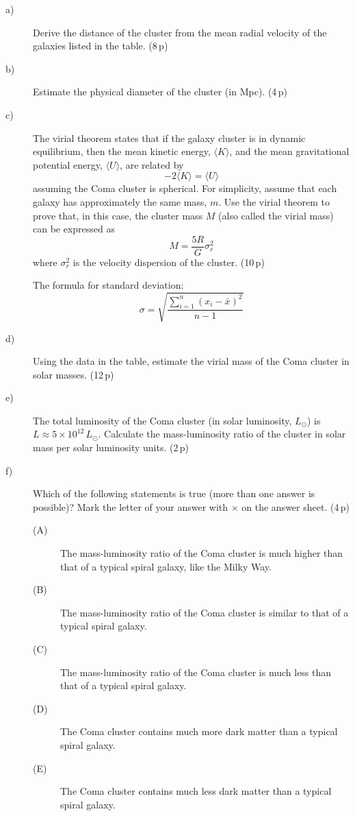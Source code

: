 \begin{description}
\item[a)] Derive the distance of the cluster from the mean radial velocity of
  the galaxies listed in the table. \hfill(8\,p)
\item[b)] Estimate the physical diameter of the cluster (in Mpc).
  \hfill(4\,p)
\item[c)] The virial theorem states that if the galaxy cluster is in dynamic
  equilibrium, then the mean kinetic energy, $\langle K\rangle$, and the mean
  gravitational potential energy, $\langle U\rangle$, are related by
  \[ -2\langle K\rangle = \langle U\rangle \]
  assuming the Coma cluster is spherical. For simplicity, assume that each
  galaxy has approximately the same mass, $m$. Use the virial theorem to prove
  that, in this case, the cluster mass $M$ (also called the virial mass) can
  be expressed as
  \[ M = \frac{5R}{G}\sigma_r^2 \]
  where $\sigma_r^2$ is the velocity dispersion of the cluster. \hfill(10\,p)

  The formula for standard deviation:
  \[ \sigma = \sqrt{\frac{\sum_{i=1}^{n}(x_i - \bar{x})^2}{n-1}} \]
\item[d)] Using the data in the table, estimate the virial mass of the Coma
  cluster in solar masses. \hfill(12\,p)
\item[e)] The total luminosity of the Coma cluster (in solar luminosity,
  $L_\odot$) is $L \approx 5 \times 10^{12}\,L_\odot$. Calculate the
  mass-luminosity ratio of the cluster in solar mass per solar luminosity
  units. \hfill(2\,p)
\item[f)] Which of the following statements is true (more than one answer is
  possible)? Mark the letter of your answer with $\times$ on the answer sheet.
  \hfill(4\,p)
  \begin{description}
  \item[(A)] The mass-luminosity ratio of the Coma cluster is much higher than
    that of a typical spiral galaxy, like the Milky Way.
  \item[(B)] The mass-luminosity ratio of the Coma cluster is similar to that
    of a typical spiral galaxy.
  \item[(C)] The mass-luminosity ratio of the Coma cluster is much less than
    that of a typical spiral galaxy.
  \item[(D)] The Coma cluster contains much more dark matter than a typical
    spiral galaxy.
  \item[(E)] The Coma cluster contains much less dark matter than a typical
    spiral galaxy.
  \end{description}
\end{description}
